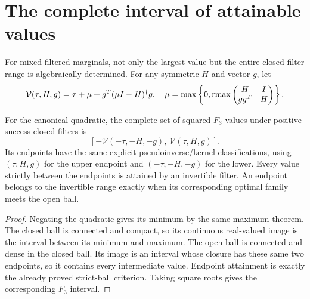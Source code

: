 \section{The complete interval of attainable values}

For mixed filtered marginals, not only the largest value but the entire
closed-filter range is algebraically determined. For any symmetric $H$
and vector $g$, let
\[
 \mathcal V(\tau,H,g)=\tau+\mu+g^T(\mu I-H)^\dagger g,
 \quad\mu=\max\left\{0,\operatorname{rmax}
   \begin{pmatrix}H&I\\gg^T&H\end{pmatrix}\right\}.
\]
\begin{corollary}
For the canonical quadratic, the complete set of squared $F_3$ values
under positive-success closed filters is
\[
 \left[-\mathcal V(-\tau,-H,-g),\ \mathcal V(\tau,H,g)\right].
\]
Its endpoints have the same explicit pseudoinverse/kernel classifications,
using $(\tau,H,g)$ for the upper endpoint and $(-\tau,-H,-g)$ for the lower.
Every value strictly between the endpoints is attained by an invertible
filter. An endpoint belongs to the invertible range exactly when its
corresponding optimal family meets the open ball.
\end{corollary}
\begin{proof}
Negating the quadratic gives its minimum by the same maximum theorem.
The closed ball is connected and compact, so its continuous real-valued
image is the interval between its minimum and maximum. The open ball is
connected and dense in the closed ball. Its image is an interval whose
closure has these same two endpoints, so it contains every intermediate
value. Endpoint attainment is exactly the already proved strict-ball
criterion. Taking square roots gives the corresponding $F_3$ interval.
\end{proof}
